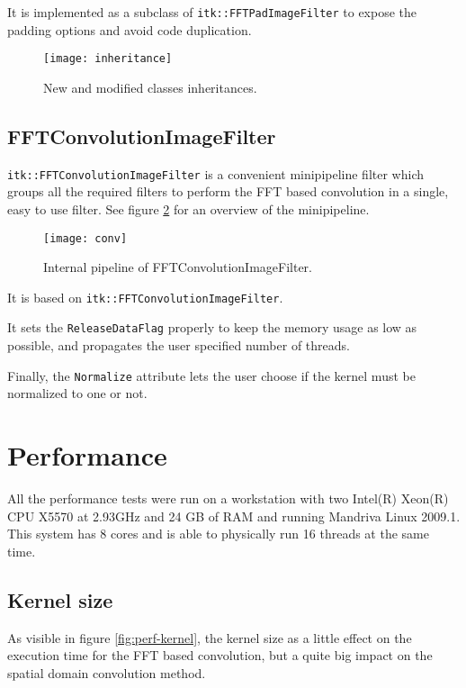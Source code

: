 \documentclass{InsightArticle}
\begin{document}
It is implemented as a subclass of \verb$itk::FFTPadImageFilter$ to expose the padding options and avoid
code duplication.

\begin{figure}[htbp]
\centering
\texttt{[image: inheritance]}
\caption{New and modified classes inheritances.\label{fig:conv-pipeline}}
\end{figure}

\subsection{FFTConvolutionImageFilter}

\verb$itk::FFTConvolutionImageFilter$ is a convenient minipipeline filter which groups all the required
filters to perform the FFT based convolution in a single, easy to use filter. See figure \ref{fig:conv-pipeline}
for an overview of the minipipeline.
\begin{figure}[htbp]
\centering
\texttt{[image: conv]}
\caption{Internal pipeline of FFTConvolutionImageFilter.\label{fig:conv-pipeline}}
\end{figure}

It is based on \verb$itk::FFTConvolutionImageFilter$.

It sets the \verb$ReleaseDataFlag$ properly to keep the memory usage as low as possible, and propagates the
user specified number of threads.

Finally, the \verb$Normalize$ attribute lets the user choose if the kernel must be normalized to one
or not.

\section{Performance}

All the performance tests were run on a workstation with two Intel(R) Xeon(R) CPU X5570 at 2.93GHz
and 24 GB of RAM and running Mandriva Linux 2009.1. This system has 8 cores and is able to physically
run 16 threads at the same time.

\subsection{Kernel size}

As visible in figure \ref{fig:perf-kernel}, the kernel size as a little effect on the execution time
for the FFT based convolution, but a quite big impact on the spatial domain convolution method.
\end{document}
